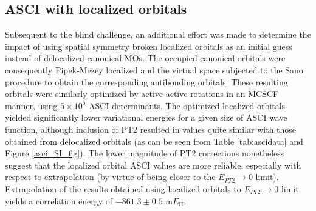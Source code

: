 \documentclass[journal=jcp,manuscript=suppinfo]{achemso}
\begin{document}
\subsection{ASCI with localized orbitals}\label{sec:asciloc}

Subsequent to the blind challenge, an additional effort was made to determine the impact of using spatial symmetry broken localized orbitals as an initial guess instead of delocalized canonical MOs. The occupied canonical orbitals were consequently Pipek-Mezey localized\cite{pipek_mezey_jcp_1989} and the virtual space subjected to the Sano procedure\cite{sano2000elementary} to obtain the corresponding antibonding orbitals. These resulting orbitals were similarly optimized by active-active rotations in an MCSCF manner, using $5\times 10^5$ ASCI determinants\cite{levine2020casscf}. The optimized localized orbitals yielded significantly lower variational energies for a given size of ASCI wave function, although inclusion of PT2 resulted in values quite similar with those obtained from delocalized orbitals (as can be seen from Table \ref{tab:ascidata} and  Figure \ref{asci_SI_fig}). The lower magnitude of PT2 corrections nonetheless suggest that the localized orbital ASCI values are more reliable, especially with respect to extrapolation (by virtue of being closer to the $E_{PT2}\to 0$ limit). Extrapolation of the results obtained using localized orbitals to $E_{PT2}\to 0$ limit yields a correlation energy of $-861.3\pm0.5$ m$E_{\text{H}}$.\\
\end{document}
